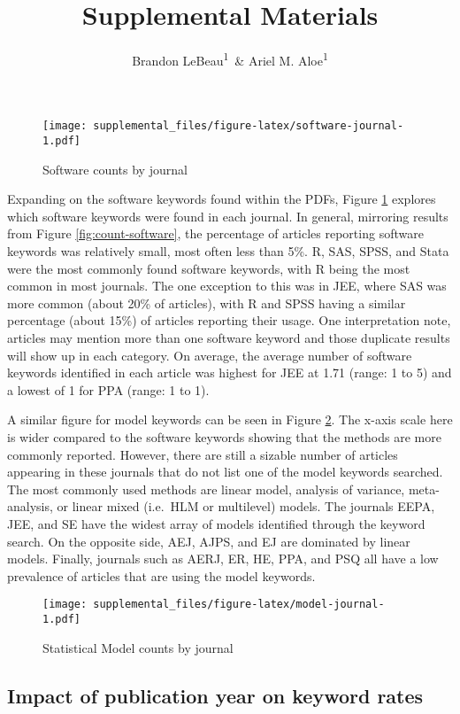 \documentclass[
  english,
  ,man]{apa6}
\affiliation{
\vspace{0.5cm}
\textsuperscript{1} University of Iowa}
\title{Supplemental Materials}
\author{Brandon LeBeau\textsuperscript{1}~\& Ariel M. Aloe\textsuperscript{1}}
\date{}
\begin{document}
\maketitle

\begin{figure}
\centering
\texttt{[image: supplemental\_files/figure-latex/software-journal-1.pdf]}
\caption{\label{fig:software-journal}Software counts by journal}
\end{figure}

Expanding on the software keywords found within the PDFs, Figure \ref{fig:software-journal} explores which software keywords were found in each journal. In general, mirroring results from Figure \ref{fig:count-software}, the percentage of articles reporting software keywords was relatively small, most often less than 5\%. R, SAS, SPSS, and Stata were the most commonly found software keywords, with R being the most common in most journals. The one exception to this was in JEE, where SAS was more common (about 20\% of articles), with R and SPSS having a similar percentage (about 15\%) of articles reporting their usage. One interpretation note, articles may mention more than one software keyword and those duplicate results will show up in each category. On average, the average number of software keywords identified in each article was highest for JEE at 1.71 (range: 1 to 5) and a lowest of 1 for PPA (range: 1 to 1).

A similar figure for model keywords can be seen in Figure \ref{fig:model-journal}. The x-axis scale here is wider compared to the software keywords showing that the methods are more commonly reported. However, there are still a sizable number of articles appearing in these journals that do not list one of the model keywords searched. The most commonly used methods are linear model, analysis of variance, meta-analysis, or linear mixed (i.e.~HLM or multilevel) models. The journals EEPA, JEE, and SE have the widest array of models identified through the keyword search. On the opposite side, AEJ, AJPS, and EJ are dominated by linear models. Finally, journals such as AERJ, ER, HE, PPA, and PSQ all have a low prevalence of articles that are using the model keywords.

\begin{figure}
\centering
\texttt{[image: supplemental\_files/figure-latex/model-journal-1.pdf]}
\caption{\label{fig:model-journal}Statistical Model counts by journal}
\end{figure}

\hypertarget{impact-of-publication-year-on-keyword-rates}{%
\subsection{Impact of publication year on keyword rates}\label{impact-of-publication-year-on-keyword-rates}}
\end{document}
